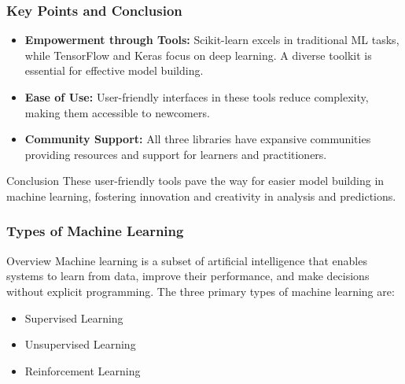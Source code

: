 \documentclass[aspectratio=169]{beamer}
\begin{document}
\begin{frame}[fragile]
  \frametitle{Key Points and Conclusion}
  \begin{itemize}
      \item \textbf{Empowerment through Tools:} 
      Scikit-learn excels in traditional ML tasks, while TensorFlow and Keras focus on deep learning. 
      A diverse toolkit is essential for effective model building.
      
      \item \textbf{Ease of Use:} 
      User-friendly interfaces in these tools reduce complexity, making them accessible to newcomers.
      
      \item \textbf{Community Support:} 
      All three libraries have expansive communities providing resources and support for learners and practitioners.
  \end{itemize}
  
  \begin{block}{Conclusion}
  These user-friendly tools pave the way for easier model building in machine learning, 
  fostering innovation and creativity in analysis and predictions.
  \end{block}
  
\end{frame}

\begin{frame}[fragile]
    \frametitle{Types of Machine Learning}
    \begin{block}{Overview}
        Machine learning is a subset of artificial intelligence that enables systems to learn from data, improve their performance, and make decisions without explicit programming. The three primary types of machine learning are:
        \begin{itemize}
            \item Supervised Learning
            \item Unsupervised Learning
            \item Reinforcement Learning
        \end{itemize}
    \end{block}
\end{frame}
\end{document}

